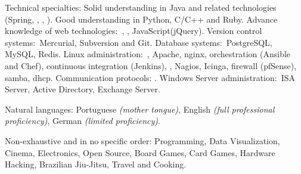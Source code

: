 \documentclass[10pt,a4paper]{article}
\begin{document}
\spacedhrule{0.5em}{-0.4em}


\inlineheadsection  %
  {Technical specialties:}
  {Solid understanding in Java and related technologies (Spring, , , ). Good understanding in Python, C/C++ and Ruby. Advance knowledge of web technologies:\ , , JavaScript(jQuery). Version control systems:\ Mercurial, Subversion and Git. Database systems:\ PostgreSQL, MySQL, Redis. Linux administration:\ , Apache, nginx, orchestration (Ansible and Chef), continuous integration (Jenkins), , Nagios, Icinga, firewall (pfSense), samba, dhcp. Communication protocols: . Windows Server administration:\ ISA Server, Active Directory, Exchange Server.
  }

\inlineheadsection
  {Natural languages:}
  {Portuguese \emph{(mother tongue)}, English \emph{(full professional proficiency)}, German \emph{(limited proficiency)}.}

\spacedhrule{1.6em}{-0.4em}


\inlineheadsection
  {Non-exhaustive and in no specific order:}
  {Programming, Data Visualization, Cinema, Electronics, Open Source, Board Games, Card Games, Hardware Hacking, Brazilian Jiu-Jitsu, Travel and Cooking.}
\end{document}
